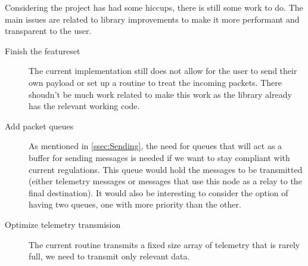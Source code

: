 
Considering the project has had some hiccups, there is still some work to do. The main issues are related to library improvements to make it more performant and transparent to the user.
\begin{description}
	\item[Finish the featureset] The current implementation still does not allow for the user to send their own payload or set up a routine to treat the incoming packets. There shoudn't be much work related to make this work as the library already has the relevant working code.
	\item[Add packet queues] As mentioned in \ref{ssec:Sending}, the need for queues that will act as a buffer for sending messages is needed if we want to stay compliant with current regulations. This queue would hold the messages to be transmitted (either telemetry messages or messages that use this node as a relay to the final destination). It would also be interesting to consider the option of having two queues, one with more priority than the other.
	\item[Optimize telemetry transmision] The current routine transmits a fixed size array of telemetry that is rarely full, we need to transmit only relevant data.
\end{description}

